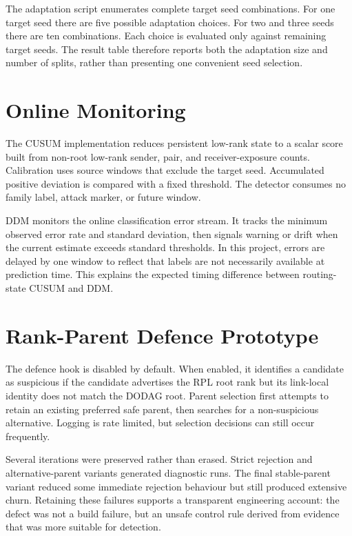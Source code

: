 The adaptation script enumerates complete target seed combinations. For one target seed there are five possible adaptation choices. For two and three seeds there are ten combinations. Each choice is evaluated only against remaining target seeds. The result table therefore reports both the adaptation size and number of splits, rather than presenting one convenient seed selection.

\section{Online Monitoring}

The CUSUM implementation reduces persistent low-rank state to a scalar score built from non-root low-rank sender, pair, and receiver-exposure counts. Calibration uses source windows that exclude the target seed. Accumulated positive deviation is compared with a fixed threshold. The detector consumes no family label, attack marker, or future window.

DDM monitors the online classification error stream. It tracks the minimum observed error rate and standard deviation, then signals warning or drift when the current estimate exceeds standard thresholds. In this project, errors are delayed by one window to reflect that labels are not necessarily available at prediction time. This explains the expected timing difference between routing-state CUSUM and DDM.

\section{Rank-Parent Defence Prototype}

The defence hook is disabled by default. When enabled, it identifies a candidate as suspicious if the candidate advertises the RPL root rank but its link-local identity does not match the DODAG root. Parent selection first attempts to retain an existing preferred safe parent, then searches for a non-suspicious alternative. Logging is rate limited, but selection decisions can still occur frequently.

Several iterations were preserved rather than erased. Strict rejection and alternative-parent variants generated diagnostic runs. The final stable-parent variant reduced some immediate rejection behaviour but still produced extensive churn. Retaining these failures supports a transparent engineering account: the defect was not a build failure, but an unsafe control rule derived from evidence that was more suitable for detection.

